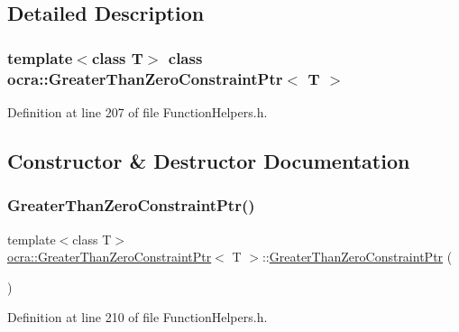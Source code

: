 \subsection{Detailed Description}
\subsubsection*{template$<$class T$>$\newline
class ocra\+::\+Greater\+Than\+Zero\+Constraint\+Ptr$<$ T $>$}



Definition at line 207 of file Function\+Helpers.\+h.



\subsection{Constructor \& Destructor Documentation}
\hypertarget{classocra_1_1GreaterThanZeroConstraintPtr_a37dc1b390edf7f0bbc3d3a8774edff12}{}\label{classocra_1_1GreaterThanZeroConstraintPtr_a37dc1b390edf7f0bbc3d3a8774edff12} 
\subsubsection{\texorpdfstring{Greater\+Than\+Zero\+Constraint\+Ptr()}{GreaterThanZeroConstraintPtr()}\hspace{0.1cm}{\footnotesize\ttfamily [1/2]}}
{\footnotesize\ttfamily template$<$class T$>$ \\
\hyperlink{classocra_1_1GreaterThanZeroConstraintPtr}{ocra\+::\+Greater\+Than\+Zero\+Constraint\+Ptr}$<$ T $>$\+::\hyperlink{classocra_1_1GreaterThanZeroConstraintPtr}{Greater\+Than\+Zero\+Constraint\+Ptr} (\begin{DoxyParamCaption}{ }\end{DoxyParamCaption})\hspace{0.3cm}{\ttfamily [inline]}}



Definition at line 210 of file Function\+Helpers.\+h.

\hypertarget{classocra_1_1GreaterThanZeroConstraintPtr_ac1a017fafc95dfc3ac4c814125a5bfac}{}\label{classocra_1_1GreaterThanZeroConstraintPtr_ac1a017fafc95dfc3ac4c814125a5bfac} 
